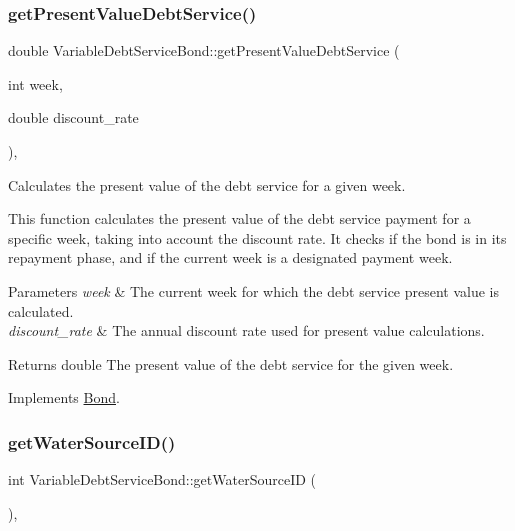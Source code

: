 \subsubsection{\texorpdfstring{get\+Present\+Value\+Debt\+Service()}{getPresentValueDebtService()}}
{\footnotesize\ttfamily double Variable\+Debt\+Service\+Bond\+::get\+Present\+Value\+Debt\+Service (\begin{DoxyParamCaption}\item[{int}]{week,  }\item[{double}]{discount\+\_\+rate }\end{DoxyParamCaption})\hspace{0.3cm}{\ttfamily [override]}, {\ttfamily [virtual]}}



Calculates the present value of the debt service for a given week. 

This function calculates the present value of the debt service payment for a specific week, taking into account the discount rate. It checks if the bond is in its repayment phase, and if the current week is a designated payment week.


\begin{DoxyParams}{Parameters}
{\em week} & The current week for which the debt service present value is calculated. \\
\hline
{\em discount\+\_\+rate} & The annual discount rate used for present value calculations.\\
\hline
\end{DoxyParams}
\begin{DoxyReturn}{Returns}
double The present value of the debt service for the given week. 
\end{DoxyReturn}


Implements \mbox{\hyperlink{classBond_a322d4ab0c0c72824ac4df5df80f14d24}{Bond}}.

\mbox{\label{classVariableDebtServiceBond_a3edee29f26e8ac74f9767770c6a951c9}} 
\subsubsection{\texorpdfstring{get\+Water\+Source\+I\+D()}{getWaterSourceID()}}
{\footnotesize\ttfamily int Variable\+Debt\+Service\+Bond\+::get\+Water\+Source\+ID (\begin{DoxyParamCaption}{ }\end{DoxyParamCaption})\hspace{0.3cm}{\ttfamily [override]}, {\ttfamily [virtual]}}



